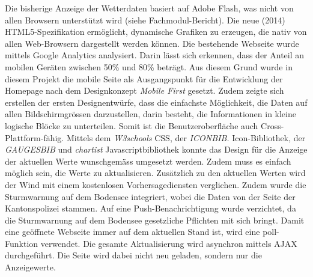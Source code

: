 \documentclass[11pt]{article}
\begin{document}
\begin{multicols}{2}
Die bisherige Anzeige der Wetterdaten basiert auf Adobe Flash, was nicht von allen Browsern unterstützt wird (siehe Fachmodul-Bericht). Die neue (2014) HTML5-Spezifikation ermöglicht, dynamische Grafiken zu erzeugen, die nativ von allen Web-Browsern dargestellt werden können. Die bestehende Webseite wurde mittels Google Analytics analysiert. Darin lässt sich erkennen, dass der Anteil an mobilen Geräten zwischen 50\% und 80\% beträgt. Aus diesem Grund wurde in diesem Projekt die mobile Seite als Ausgangspunkt für die Entwicklung der Homepage nach dem Designkonzept \textit{Mobile First} gesetzt. Zudem zeigte sich erstellen der ersten Designentwürfe, dass die einfachste Möglichkeit, die Daten auf allen Bildschirmgrössen darzustellen, darin besteht, die Informationen in kleine logische Blöcke zu unterteilen. Somit ist die Benutzeroberfläche auch Cross-Plattform-fähig. Mittels dem \textit{W3schools} CSS, der \textit{ICONBIB.} Icon-Bibliothek, der \textit{GAUGESBIB} und \textit{chartist} Javascriptbibliothek konnte das Design für die Anzeige der aktuellen Werte wunschgemäss umgesetzt werden. Zudem muss es einfach möglich sein, die Werte zu aktualisieren.  %
Zusätzlich zu den aktuellen Werten wird der Wind mit einem kostenlosen Vorhersagediensten verglichen. Zudem wurde die Sturmwarnung auf dem Bodensee integriert, wobei die Daten von der Seite der Kantonspolizei stammen. Auf eine Push-Benachrichtigung wurde verzichtet, da die Sturmwarnung auf dem Bodensee gesetzliche Pflichten mit sich bringt. Damit eine geöffnete Webseite immer auf dem aktuellen Stand ist, wird eine poll-Funktion verwendet. Die gesamte Aktualisierung wird asynchron mittels AJAX durchgeführt. Die Seite wird dabei nicht neu geladen,  sondern nur die Anzeigewerte.\\


\end{multicols}
\end{document}
